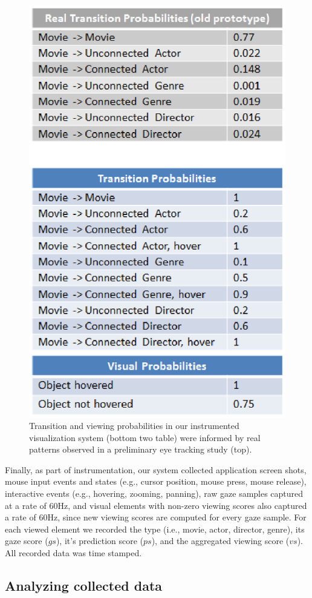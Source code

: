 \begin{figure}[htb]
  \centering
  \includegraphics[width=0.75\linewidth]{images/transitions.eps}
  \caption{Transition and viewing probabilities in our instrumented visualization system (bottom two table) were informed by real patterns observed in a preliminary eye tracking study (top). }
	\label{fig:transitions}
\end{figure}

Finally, as part of instrumentation, our system collected application screen shots, mouse input events and states (e.g., cursor position, mouse press, mouse release), interactive events (e.g., hovering, zooming, panning), raw gaze samples captured at a rate of $60$Hz, and visual elements with non-zero viewing scores also captured a rate of $60$Hz, since new viewing scores are computed for every gaze sample. For each viewed element we recorded the type (i.e., movie, actor, director, genre), its gaze score ($gs$), it's prediction score ($ps$), and the aggregated viewing score ($vs$). All recorded data was time stamped. 

\subsection{Analyzing collected data}

